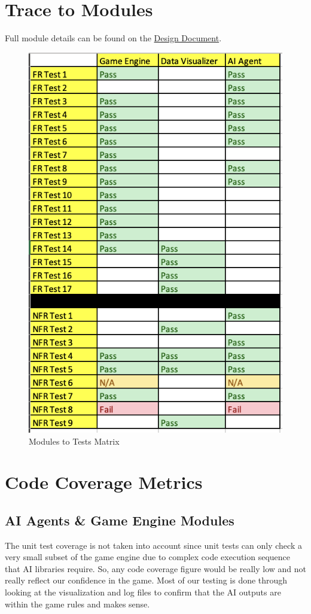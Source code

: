 \documentclass[12pt, titlepage]{article}
\begin{document}
\clearpage
\section{Trace to Modules}		
Full module details can be found on the \href{https://github.com/Dorps/aiboardgame/blob/main/docs/Design/Design.pdf}{Design Document}. 
\begin{figure}[!ht]
    \centering
    \includegraphics{MG.png}
    \caption{Modules to Tests Matrix}
    \label{Modules to Tests Matrix}
\end{figure}
\section{Code Coverage Metrics}
\subsection{AI Agents & Game Engine Modules}
The unit test coverage is not taken into account since unit tests can only check a very small subset of the game engine due to complex code execution sequence that AI libraries require. So, any code coverage figure would be really low and not really reflect our confidence in the game. Most of our testing is done through looking at the visualization and log files to confirm that the AI outputs are within the game rules and makes sense.
\end{document}
